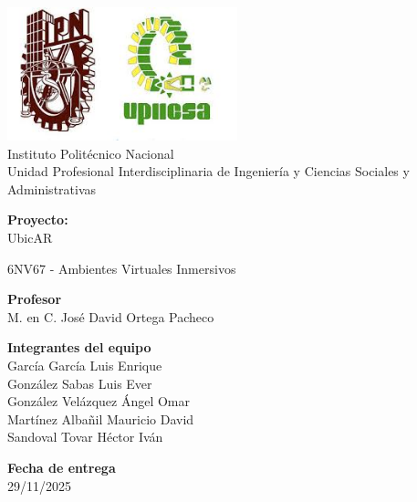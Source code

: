 
\begin{titlepage}
	\begingroup
	\fontsize{16}{15}\selectfont %
	
	\centering %
	
	\includegraphics[width=0.5\textwidth]{imagenes/upiicsa-ipn}
	\\ Instituto Politécnico Nacional
	\\ Unidad Profesional Interdisciplinaria de Ingeniería y Ciencias Sociales y Administrativas
	
	\vspace{1cm}
	
	\textbf{Proyecto:}
	\\ UbicAR
	
	\vspace{1cm}
	
	6NV67 - Ambientes Virtuales Inmersivos
	
	\vspace{1cm}
	
	\textbf{Profesor}
	\\M. en C. José David Ortega Pacheco
	
	\vspace{1cm}
	
	\textbf{Integrantes del equipo}\\
	García García Luis Enrique \\
	González Sabas Luis Ever \\
	González Velázquez Ángel Omar \\
	Martínez Albañil Mauricio David \\
	Sandoval Tovar Héctor Iván  
	
	\vspace{1cm}
	
	\textbf{Fecha de entrega}\\
	29/11/2025
	
	\endgroup
\end{titlepage}